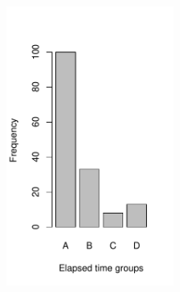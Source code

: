 \begin{figure}[t]
    \centering
    \includegraphics[width=0.5\textwidth]{plots/timecost-barplot/timecost-barplot.pdf}
    \caption{}
    \label{fig:timecost-barplot}
\end{figure}

